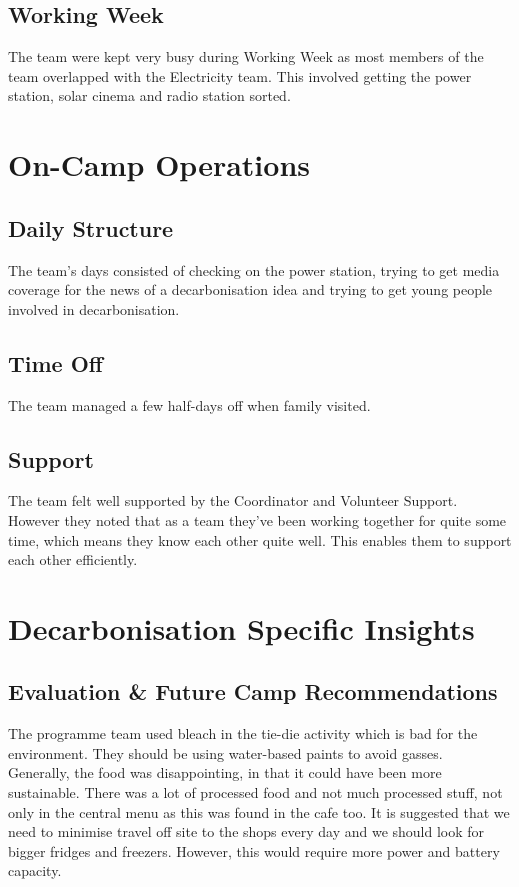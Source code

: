 \subsection{Working Week}
The team were kept very busy during Working Week as most members of the team overlapped with the Electricity team. This involved getting the power station, solar cinema and radio station sorted.

\section{On-Camp Operations}
\subsection{Daily Structure}
The team's days consisted of checking on the power station, trying to get media coverage for the news of a decarbonisation idea and trying to get young people involved in decarbonisation.
\subsection{Time Off}
The team managed a few half-days off when family visited.
\subsection{Support}
The team felt well supported by the Coordinator and Volunteer Support. However they noted that as a team they've been working together for quite some time, which means they know each other quite well. This enables them to support each other efficiently.

\section{Decarbonisation Specific Insights}
\subsection{Evaluation \& Future Camp Recommendations}
The programme team used bleach in the tie-die activity which is bad for the environment. They should be using water-based paints to avoid gasses.\\

Generally, the food was disappointing, in that it could have been more sustainable. There was a lot of processed food and not much processed stuff, not only in the central menu as this was found in the cafe too. It is suggested that we need to minimise travel off site to the shops every day and we should look for bigger fridges and freezers. However, this would require more power and battery capacity. \\

